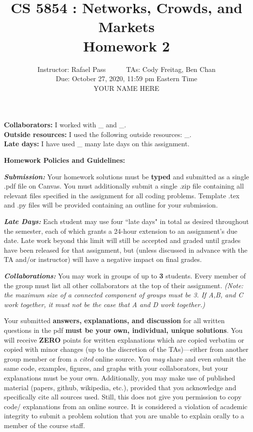 \documentclass[11pt,letterpaper]{article}
\title{CS 5854 : Networks, Crowds, and Markets\\ Homework 2}
\author{Instructor: Rafael Pass\ \ \ \ \ \ TAs: Cody Freitag, Ben Chan
\medskip \\
Due: October 27, 2020, 11:59 pm Eastern Time
\bigskip \\ 
\iftemplate
YOUR NAME HERE
\fi
}
\date{}
\newif \iftemplate \templatetrue
\theoremstyle{definition}
\begin{document}
\maketitle

\iftemplate
\noindent 
\textbf{Collaborators:} I worked with \_ and \_. \\
\noindent
\textbf{Outside resources:} I used the following outside resources: \_. \\
\noindent
\textbf{Late days:} I have used \_ many late days on this assignment.
\bigskip
\fi

\iftemplate
\else
\noindent
\textbf{Homework Policies and Guidelines:}
\medskip

\begin{footnotesize}

\emph{\textbf{Submission:}} 
Your homework solutions must be \textbf{typed} and submitted
as a single .pdf file on Canvas. 
You must additionally submit a single .zip file containing all relevant files specified in 
the assignment for all coding problems.
Template .tex and .py files will be provided containing an outline for your submission.

\emph{\textbf{Late Days:}} 
Each student may use four ``late days" in total as desired throughout the semester, each of which grants a 24-hour extension to an assignment's 
due date. Late work beyond this limit will still be accepted and 
graded until grades have been released for that assignment, but (unless discussed in 
advance with the TA and/or instructor) will have a negative impact on final grades.

\emph{\textbf{Collaborations:}}
You may work in groups of up to \textbf{3} students. Every member of the group must list all other collaborators
at the top of their assignment. \emph{(Note: the maximum size of a connected component
of groups must be 3. If A,B, and C work together, it must not be the case that A and D work together.)}

Your submitted \textbf{answers, explanations, and discussion} for all written questions in the pdf \textbf{must be your own, individual, unique solutions}. You will receive \textbf{ZERO} points for written explanations which are copied verbatim or copied with minor changes (up to the discretion of the TAs)---either from another group member or from a \emph{cited} online source.
You \emph{may} share and even submit the same code, examples, figures, and graphs with your collaborators, but your explanations must be your own.
Additionally, you may make use of published material (papers, github, wikipedia, etc.), provided that you acknowledge and specifically cite all sources used.
Still, this does not give you permission to copy code/ explanations from an online source.
It is considered a violation of academic integrity to submit a problem solution that you are unable to explain orally to a member of the course staff.


\end{footnotesize}
\end{document}

